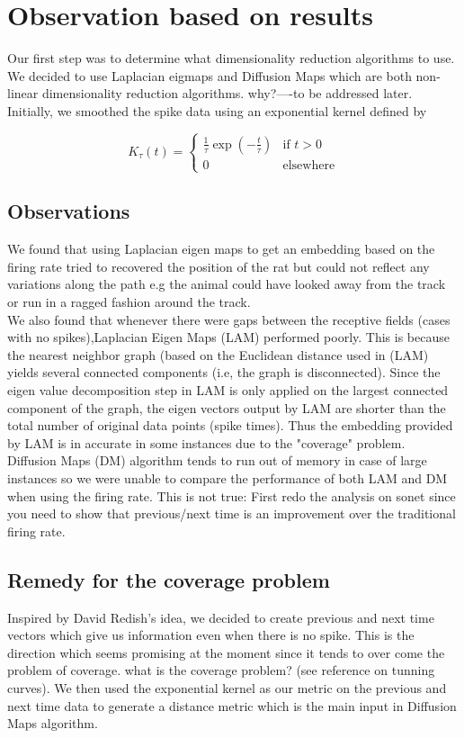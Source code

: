 \section{Observation based on results}

Our first step was to determine what dimensionality reduction algorithms to use.
We decided to use Laplacian eigmaps \cite{belkin2003laplacian} and Diffusion Maps \cite{coifman2006} which are both non-linear dimensionality reduction algorithms.
why?----to be addressed later.
Initially, we smoothed the spike data using an exponential kernel defined by

\[
  K_{\tau}(t) =
  \begin{cases}
                 \frac{1}{\tau} \exp(-\frac{t}{\tau}) & \text{if $t > 0$} \\
                  0 & \text{elsewhere} 
  \end{cases}
\]

\subsection{Observations}
We found that using Laplacian eigen maps to get an embedding based on the firing rate tried to
recovered the position of the rat but could not reflect any variations along the path
e.g the animal could have looked away from the track or run in a ragged fashion around the track.\\

We also found that whenever there were gaps between the receptive fields (cases with no spikes),Laplacian Eigen Maps (LAM) performed poorly.
This is because the nearest neighbor graph (based on the Euclidean distance used in (LAM) yields several connected components (i.e, the graph is disconnected).
Since the eigen value decomposition step  in LAM is only applied on the largest connected
component of the graph, the eigen vectors output by LAM are shorter than the total number of original data points (spike times). Thus the embedding provided by LAM is in accurate in some
instances due to the "coverage" problem.\\

Diffusion Maps (DM) algorithm tends to run out of memory in case of large instances
so we were unable to compare the performance of both LAM and DM when using the firing rate.
This is not true: First redo the analysis on sonet since you need to show that
previous/next time is an improvement over the traditional firing rate.

\subsection{Remedy for the coverage problem}
Inspired by David Redish's idea, we decided to create previous and next time vectors which
give us information even when there is no spike.
This is the direction which seems promising at the moment since it tends to over come
the problem of coverage. what is the coverage problem? (see reference on tunning curves).
We then used the exponential kernel as our metric on the previous and next time data
to generate a distance metric which is the main input in Diffusion Maps algorithm.




